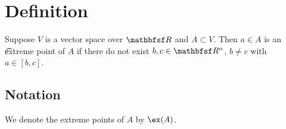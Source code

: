 

\section*{Definition}

Suppose $V$ is a vector space over $\R $ and $A \subset V$.
Then $a \in A$ is an \t{extreme point} of $A$ if there do not exist $b, c \in \R ^n$, $b \neq c$ with $a \in [b, c]$.


\subsection*{Notation}

We denote the extreme points of $A$ by $\ex(A)$.

\blankpage
\blankpage